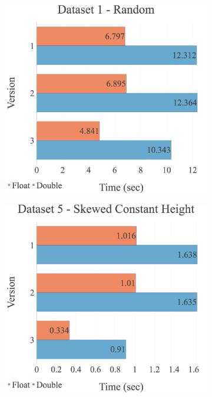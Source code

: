 \begin{figure}[H]
\centering
\begin{subfigure}{.49\textwidth}
  \centering
  \includegraphics[width=1\linewidth]{img/experiments/multi-versions-1_RAND.png}
\end{subfigure}
\begin{subfigure}{.49\textwidth}
  \centering
  \includegraphics[width=1\linewidth]{img/experiments/multi-versions-5_SKEWEDCONSTHEIGHT.png}

\end{subfigure}
\end{figure}
